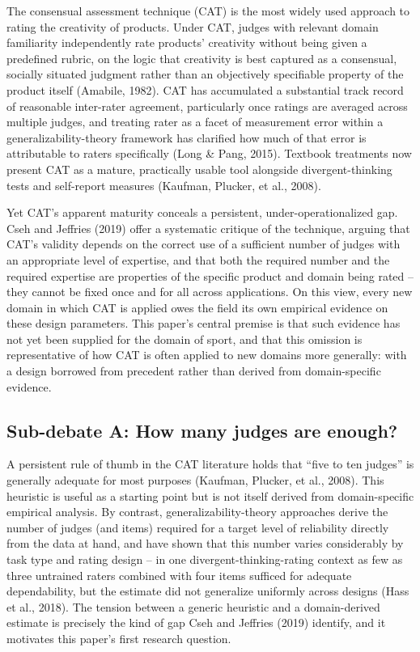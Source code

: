 \documentclass[
  12pt,
]{article}
\begin{document}
The consensual assessment technique (CAT) is the most widely used
approach to rating the creativity of products. Under CAT, judges with
relevant domain familiarity independently rate products' creativity
without being given a predefined rubric, on the logic that creativity is
best captured as a consensual, socially situated judgment rather than an
objectively specifiable property of the product itself (Amabile, 1982).
CAT has accumulated a substantial track record of reasonable inter-rater
agreement, particularly once ratings are averaged across multiple
judges, and treating rater as a facet of measurement error within a
generalizability-theory framework has clarified how much of that error
is attributable to raters specifically (Long \& Pang, 2015). Textbook
treatments now present CAT as a mature, practically usable tool
alongside divergent-thinking tests and self-report measures (Kaufman,
Plucker, et al., 2008).

Yet CAT's apparent maturity conceals a persistent, under-operationalized
gap. Cseh and Jeffries (2019) offer a systematic critique of the
technique, arguing that CAT's validity depends on the correct use of a
sufficient number of judges with an appropriate level of expertise, and
that both the required number and the required expertise are properties
of the specific product and domain being rated -- they cannot be fixed
once and for all across applications. On this view, every new domain in
which CAT is applied owes the field its own empirical evidence on these
design parameters. This paper's central premise is that such evidence
has not yet been supplied for the domain of sport, and that this
omission is representative of how CAT is often applied to new domains
more generally: with a design borrowed from precedent rather than
derived from domain-specific evidence.

\subsection{Sub-debate A: How many judges are
enough?}\label{sub-debate-a-how-many-judges-are-enough}

A persistent rule of thumb in the CAT literature holds that ``five to
ten judges'' is generally adequate for most purposes (Kaufman, Plucker,
et al., 2008). This heuristic is useful as a starting point but is not
itself derived from domain-specific empirical analysis. By contrast,
generalizability-theory approaches derive the number of judges (and
items) required for a target level of reliability directly from the data
at hand, and have shown that this number varies considerably by task
type and rating design -- in one divergent-thinking-rating context as
few as three untrained raters combined with four items sufficed for
adequate dependability, but the estimate did not generalize uniformly
across designs (Hass et al., 2018). The tension between a generic
heuristic and a domain-derived estimate is precisely the kind of gap
Cseh and Jeffries (2019) identify, and it motivates this paper's first
research question.
\end{document}
